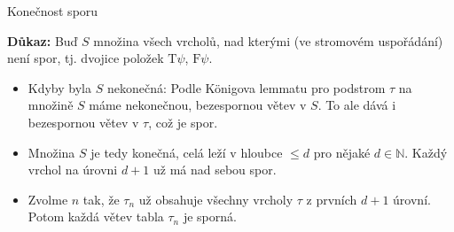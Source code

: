 \documentclass{beamer}
\begin{document}
\begin{frame}{Konečnost sporu}


    \textbf{Důkaz:} 
    Buď $S$ množina všech vrcholů, nad kterými (ve stromovém uspořádání) není spor, tj. dvojice položek $\mathrm{T}\psi$, $\mathrm{F}\psi$.

    \begin{itemize}
        \item \alert{Kdyby byla $S$ nekonečná:} Podle Königova lemmatu pro podstrom $\tau$ na množině $S$ máme nekonečnou, bezespornou větev v $S$. To ale dává i \alert{bezespornou větev v $\tau$}, což je spor. 
    
        \item \alert{Množina $S$ je tedy konečná,} celá leží v hloubce $\leq d$ pro nějaké $d\in\mathbb N$. Každý vrchol \alert{na úrovni $d+1$ už má nad sebou spor}. 
        
        \item Zvolme $n$ tak, že $\tau_n$ už obsahuje všechny vrcholy $\tau$ z prvních $d+1$ úrovní. Potom každá větev tabla $\tau_n$ je sporná.\hfill\qedsymbol
    \end{itemize}    

\end{frame}
\end{document}
